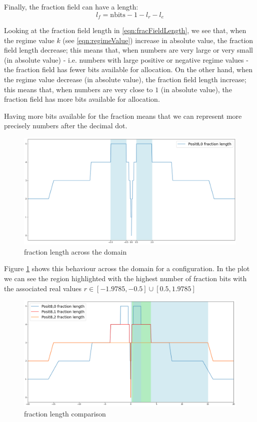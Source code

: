 Finally, the fraction field can have a length:
\begin{equation}\label{eqn:fracFieldLength}
l_f = \text{nbits} - 1 - l_r - l_e
\end{equation}

Looking at the fraction field length in \ref{eqn:fracFieldLength}, we see that, when the regime value $k$ (see \ref{eqn:regimeValue}) increase in absolute value, the fraction field length decrease; this means that, when numbers are very large or very small (in absolute value) - i.e. numbers with large positive or negative regime values - the fraction field has fewer bits available for allocation. On the other hand, when the regime value decrease (in absolute value), the fraction field length increase; this means that, when numbers are very close to $1$ (in absolute value), the fraction field has more bits available for allocation. 

Having more bits available for the fraction means that we can represent more precisely numbers after the decimal dot.

\begin{figure}
    \centering
    \includegraphics[width=\linewidth]{img/posit80fractionsWithZoom.png}
    \caption{ fraction length across the domain}
    \label{fig:posit80Fractions}
\end{figure}

Figure \ref{fig:posit80Fractions} shows this behaviour across the domain for a  configuration. In the plot we can see the region highlighted with the highest number of fraction bits with the associated real values $r \in [-1.9785,-0.5] \cup [0.5,1.9785]$


\begin{figure}
    \centering
    \includegraphics[width=\linewidth]{img/posit8xFractions.png}
    \caption{ fraction length comparison}
    \label{fig:posit8xFractions}
\end{figure}

